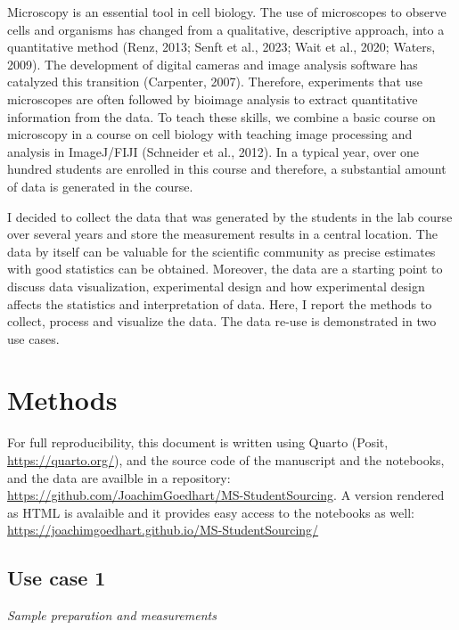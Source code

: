 \documentclass[
]{agujournal2019}
\begin{document}
Microscopy is an essential tool in cell biology. The use of microscopes
to observe cells and organisms has changed from a qualitative,
descriptive approach, into a quantitative method (Renz, 2013; Senft et
al., 2023; Wait et al., 2020; Waters, 2009). The development of digital
cameras and image analysis software has catalyzed this transition
(Carpenter, 2007). Therefore, experiments that use microscopes are often
followed by bioimage analysis to extract quantitative information from
the data. To teach these skills, we combine a basic course on microscopy
in a course on cell biology with teaching image processing and analysis
in ImageJ/FIJI (Schneider et al., 2012). In a typical year, over one
hundred students are enrolled in this course and therefore, a
substantial amount of data is generated in the course.

I decided to collect the data that was generated by the students in the
lab course over several years and store the measurement results in a
central location. The data by itself can be valuable for the scientific
community as precise estimates with good statistics can be obtained.
Moreover, the data are a starting point to discuss data visualization,
experimental design and how experimental design affects the statistics
and interpretation of data. Here, I report the methods to collect,
process and visualize the data. The data re-use is demonstrated in two
use cases.

\hypertarget{sec-data-methods}{%
\section*{Methods}\label{sec-data-methods}}

For full reproducibility, this document is written using Quarto (Posit,
\url{https://quarto.org/}), and the source code of the manuscript and
the notebooks, and the data are availble in a repository:
\url{https://github.com/JoachimGoedhart/MS-StudentSourcing}. A version
rendered as HTML is avalaible and it provides easy access to the
notebooks as well:
\url{https://joachimgoedhart.github.io/MS-StudentSourcing/}

\hypertarget{use-case-1}{%
\subsection*{Use case 1}\label{use-case-1}}

\emph{Sample preparation and measurements}
\end{document}
